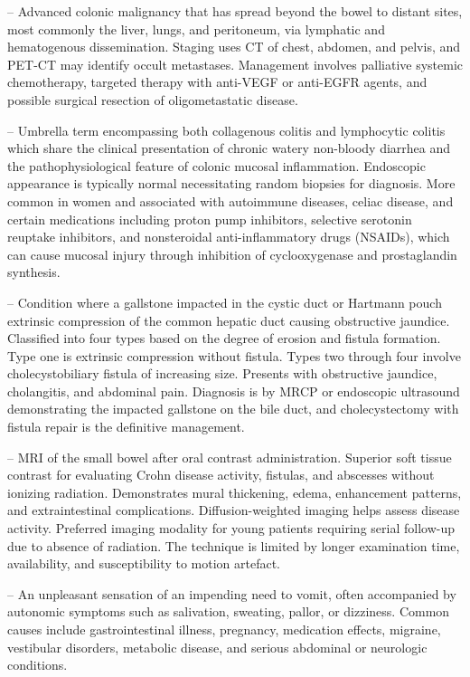 -- Advanced colonic malignancy that has spread beyond the bowel to distant sites, most commonly the liver, lungs, and peritoneum, via lymphatic and hematogenous dissemination. Staging uses CT of chest, abdomen, and pelvis, and PET-CT may identify occult metastases. Management involves palliative systemic chemotherapy, targeted therapy with anti-VEGF or anti-EGFR agents, and possible surgical resection of oligometastatic disease.

-- Umbrella term encompassing both collagenous colitis and lymphocytic colitis which share the clinical presentation of chronic watery non-bloody diarrhea and the pathophysiological feature of colonic mucosal inflammation. Endoscopic appearance is typically normal necessitating random biopsies for diagnosis. More common in women and associated with autoimmune diseases, celiac disease, and certain medications including proton pump inhibitors, selective serotonin reuptake inhibitors, and nonsteroidal anti-inflammatory drugs (NSAIDs), which can cause mucosal injury through inhibition of cyclooxygenase and prostaglandin synthesis.

-- Condition where a gallstone impacted in the cystic duct or Hartmann pouch extrinsic compression of the common hepatic duct causing obstructive jaundice. Classified into four types based on the degree of erosion and fistula formation. Type one is extrinsic compression without fistula. Types two through four involve cholecystobiliary fistula of increasing size. Presents with obstructive jaundice, cholangitis, and abdominal pain. Diagnosis is by MRCP or endoscopic ultrasound demonstrating the impacted gallstone on the bile duct, and cholecystectomy with fistula repair is the definitive management.

-- MRI of the small bowel after oral contrast administration. Superior soft tissue contrast for evaluating Crohn disease activity, fistulas, and abscesses without ionizing radiation. Demonstrates mural thickening, edema, enhancement patterns, and extraintestinal complications. Diffusion-weighted imaging helps assess disease activity. Preferred imaging modality for young patients requiring serial follow-up due to absence of radiation. The technique is limited by longer examination time, availability, and susceptibility to motion artefact.

-- An unpleasant sensation of an impending need to vomit, often accompanied by autonomic symptoms such as salivation, sweating, pallor, or dizziness. Common causes include gastrointestinal illness, pregnancy, medication effects, migraine, vestibular disorders, metabolic disease, and serious abdominal or neurologic conditions.

